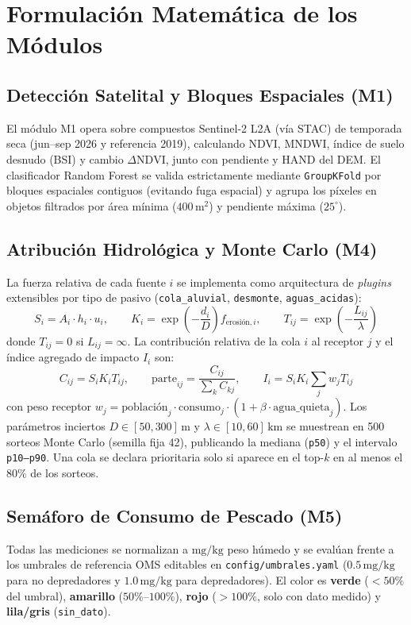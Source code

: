 \documentclass[11pt,a4paper]{article}
\begin{document}
\section{Formulación Matemática de los Módulos}

\subsection{Detección Satelital y Bloques Espaciales (M1)}
El módulo M1 opera sobre compuestos Sentinel-2 L2A (vía STAC) de temporada seca (jun--sep 2026 y referencia 2019), calculando NDVI, MNDWI, índice de suelo desnudo (BSI) y cambio $\Delta\text{NDVI}$, junto con pendiente y HAND del DEM. El clasificador Random Forest se valida estrictamente mediante \texttt{GroupKFold} por bloques espaciales contiguos (evitando fuga espacial) y agrupa los píxeles en objetos filtrados por área mínima ($400\,\text{m}^2$) y pendiente máxima ($25^\circ$).

\subsection{Atribución Hidrológica y Monte Carlo (M4)}
La fuerza relativa de cada fuente $i$ se implementa como arquitectura de \textit{plugins} extensibles por tipo de pasivo (\texttt{cola\_aluvial}, \texttt{desmonte}, \texttt{aguas\_acidas}):
\begin{equation}
  S_i = A_i \cdot h_i \cdot u_i, \qquad K_i = \exp\!\left(-\frac{d_i}{D}\right) f_{\text{erosión}, i}, \qquad T_{ij} = \exp\!\left(-\frac{L_{ij}}{\lambda}\right)
\end{equation}
donde $T_{ij} = 0$ si $L_{ij} = \infty$. La contribución relativa de la cola $i$ al receptor $j$ y el índice agregado de impacto $I_i$ son:
\begin{equation}
  C_{ij} = S_i K_i T_{ij}, \qquad \text{parte}_{ij} = \frac{C_{ij}}{\sum_k C_{kj}}, \qquad I_i = S_i K_i \sum_j w_j T_{ij}
\end{equation}
con peso receptor $w_j = \text{población}_j \cdot \text{consumo}_j \cdot (1 + \beta \cdot \text{agua\_quieta}_j)$. Los parámetros inciertos $D \in [50, 300]\,\text{m}$ y $\lambda \in [10, 60]\,\text{km}$ se muestrean en 500 sorteos Monte Carlo (semilla fija 42), publicando la mediana (\texttt{p50}) y el intervalo \texttt{p10--p90}. Una cola se declara prioritaria solo si aparece en el top-$k$ en al menos el $80\%$ de los sorteos.

\subsection{Semáforo de Consumo de Pescado (M5)}
Todas las mediciones se normalizan a $\text{mg/kg}$ peso húmedo y se evalúan frente a los umbrales de referencia OMS editables en \texttt{config/umbrales.yaml} ($0.5\,\text{mg/kg}$ para no depredadores y $1.0\,\text{mg/kg}$ para depredadores). El color es \textbf{verde} ($<50\%$ del umbral), \textbf{amarillo} ($50\%$--$100\%$), \textbf{rojo} ($>100\%$, solo con dato medido) y \textbf{lila/gris} (\texttt{sin\_dato}).
\end{document}
